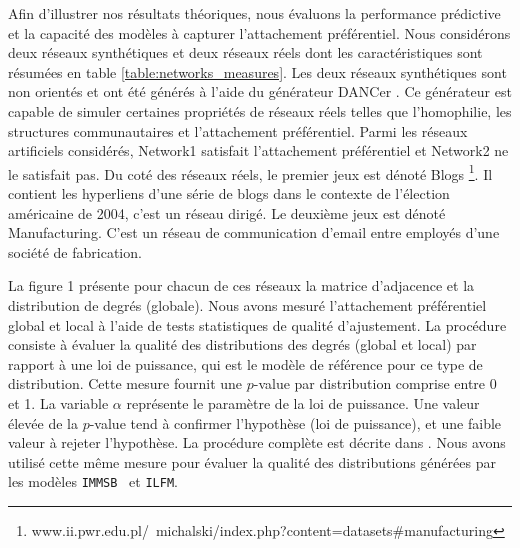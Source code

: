 \documentclass[french]{hermes-journal}
\newcommand{\ilfm}{\texttt{ILFM}}
\newcommand{\immsb}{\texttt{IMMSB}}
\begin{document}
Afin d'illustrer nos résultats théoriques, nous évaluons la performance prédictive et la capacité des modèles à capturer l'attachement préférentiel. Nous considérons deux réseaux synthétiques et deux réseaux réels dont les caractéristiques sont résumées en table \ref{table:networks_measures}. Les deux réseaux synthétiques sont non orientés et ont été générés à l'aide du générateur DANCer \cite{largeron2015}. Ce générateur est capable de  simuler certaines propriétés de réseaux réels telles que l'homophilie, les structures communautaires et l'attachement préférentiel. Parmi les réseaux artificiels considérés, Network1 satisfait l'attachement préférentiel et Network2 ne le satisfait pas. Du coté des réseaux réels, le premier jeux est dénoté Blogs \footnote{www.ii.pwr.edu.pl/~michalski/index.php?content=datasets\#manufacturing}. Il contient les hyperliens d'une série de blogs dans le contexte de l'élection américaine de 2004, c'est un réseau dirigé. Le deuxième jeux est dénoté Manufacturing. C'est un réseau de communication d'email entre employés d'une société de fabrication. 



La figure 1 présente pour chacun de ces réseaux la matrice d'adjacence et la distribution de degrés (globale). Nous avons mesuré l'attachement préférentiel global et local à l'aide de tests statistiques de qualité d'ajustement. La procédure consiste à évaluer la qualité des distributions des degrés (global et local) par rapport à une loi de puissance, qui est le modèle de référence pour ce type de distribution. Cette mesure fournit une $p$-value par distribution comprise entre 0 et 1. La variable $\alpha$ représente le paramètre de la loi de puissance. Une valeur élevée de la $p$-value tend à confirmer l'hypothèse (loi de puissance), et une faible valeur à rejeter l'hypothèse. La procédure complète est décrite dans \cite{clauset2009power}.
Nous avons utilisé cette même mesure pour évaluer la qualité des distributions générées par les modèles \immsb~ et \ilfm.
\end{document}
